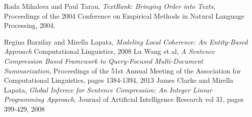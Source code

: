 \documentclass[11pt]{article}
\begin{document}
%
%
\begin{thebibliography}{}

	Rada Mihalcea and Paul Tarau,
	\textit{TextRank: Bringing Order into Texts},
	Proceedings of the 2004 Conference on Empirical Methods in Natural Language Processing,
	2004.

    Regina Barzilay and Mirella Lapata,
    \textit{Modeling Local Coherence: An Entity-Based Approach}
    Computational Linguistics, 
    2008
	Lu Wang et al,
	\textit{A Sentence Compression Based Framework to Query-Focused Multi-Document Summarization},
	Proceedings of the 51st Annual Meeting of the Association for Computational Linguistics, pages 1384-1394,
	2013
	James Clarke and Mirella Lapata,
	\textit{Global Inferece for Sentence Compression: An Integer Linear Programming Approach},
	Journal of Artificial Intelligence Research vol 31, pages 399-429,
	2008

\end{thebibliography}
\end{document}
